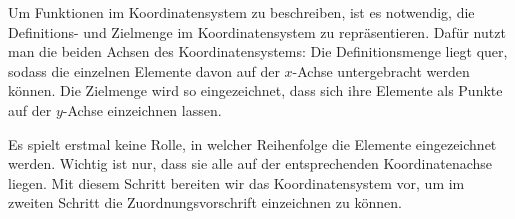 \documentclass[../../main.tex]{subfiles}
\begin{document}

Um Funktionen im Koordinatensystem zu beschreiben, ist es notwendig, die Definitions- und Zielmenge im Koordinatensystem zu repräsentieren. Dafür nutzt man die beiden Achsen des Koordinatensystems: Die Definitionsmenge liegt quer, sodass die einzelnen Elemente davon auf der $x$-Achse untergebracht werden können. Die Zielmenge wird so eingezeichnet, dass sich ihre Elemente als Punkte auf der $y$-Achse einzeichnen lassen.

Es spielt erstmal keine Rolle, in welcher Reihenfolge die Elemente eingezeichnet werden. Wichtig ist nur, dass sie alle auf der entsprechenden Koordinatenachse liegen. Mit diesem Schritt bereiten wir das Koordinatensystem vor, um im zweiten Schritt die Zuordnungsvorschrift einzeichnen zu können.
\end{document}
